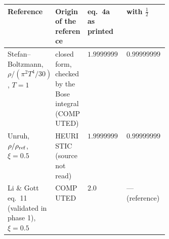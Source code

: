 \begin{tabular}{>{\raggedright\arraybackslash}p{0.17\linewidth}>{\raggedright\arraybackslash}p{0.2\linewidth}ll}
\toprule
Reference & Origin of the reference & eq.~4a as printed & with $\tfrac12$ \\
\midrule
Stefan--Boltzmann, $\rho/(\pi^2T^4/30)$, $T=1$ & closed form, checked by the Bose integral (COMPUTED) & $1.9999999999999999999$ & $0.99999999999999999997$ \\
Unruh, $\rho/\rho_{\rm ref}$, $\xi=0.5$ & HEURISTIC (source not read) & $1.9999999999999999999$ & $0.99999999999999999994$ \\
Li \& Gott eq.~11 (validated in phase 1), $\xi=0.5$ & COMPUTED & $2.0$ & --- (reference) \\
\bottomrule
\end{tabular}
